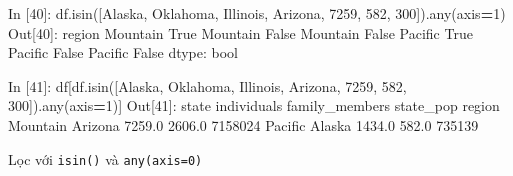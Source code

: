 \documentclass[
]{book}
\newenvironment{Shaded}{\begin{snugshade}}{\end{snugshade}}
\newcommand{\BuiltInTok}[1]{#1}
\newcommand{\DecValTok}[1]{\textcolor[rgb]{0.00,0.00,0.81}{#1}}
\newcommand{\FloatTok}[1]{\textcolor[rgb]{0.00,0.00,0.81}{#1}}
\newcommand{\NormalTok}[1]{#1}
\newcommand{\OperatorTok}[1]{\textcolor[rgb]{0.81,0.36,0.00}{\textbf{#1}}}
\newcommand{\StringTok}[1]{\textcolor[rgb]{0.31,0.60,0.02}{#1}}
\newcommand{\VariableTok}[1]{\textcolor[rgb]{0.00,0.00,0.00}{#1}}
\begin{document}
\begin{Shaded}
\begin{Highlighting}[]
\NormalTok{In [}\DecValTok{40}\NormalTok{]: df.isin([}\StringTok{\textquotesingle{}Alaska\textquotesingle{}}\NormalTok{, }\StringTok{\textquotesingle{}Oklahoma\textquotesingle{}}\NormalTok{, }\StringTok{\textquotesingle{}Illinois\textquotesingle{}}\NormalTok{, }\StringTok{\textquotesingle{}Arizona\textquotesingle{}}\NormalTok{, }\DecValTok{7259}\NormalTok{, }\DecValTok{582}\NormalTok{, }\DecValTok{300}\NormalTok{]).}\BuiltInTok{any}\NormalTok{(axis}\OperatorTok{=}\DecValTok{1}\NormalTok{)}
\NormalTok{Out[}\DecValTok{40}\NormalTok{]:}
\NormalTok{region}
\NormalTok{Mountain     }\VariableTok{True}
\NormalTok{Mountain    }\VariableTok{False}
\NormalTok{Mountain    }\VariableTok{False}
\NormalTok{Pacific      }\VariableTok{True}
\NormalTok{Pacific     }\VariableTok{False}
\NormalTok{Pacific     }\VariableTok{False}
\NormalTok{dtype: }\BuiltInTok{bool}

\NormalTok{In [}\DecValTok{41}\NormalTok{]: df[df.isin([}\StringTok{\textquotesingle{}Alaska\textquotesingle{}}\NormalTok{, }\StringTok{\textquotesingle{}Oklahoma\textquotesingle{}}\NormalTok{, }\StringTok{\textquotesingle{}Illinois\textquotesingle{}}\NormalTok{, }\StringTok{\textquotesingle{}Arizona\textquotesingle{}}\NormalTok{, }\DecValTok{7259}\NormalTok{, }\DecValTok{582}\NormalTok{, }\DecValTok{300}\NormalTok{]).}\BuiltInTok{any}\NormalTok{(axis}\OperatorTok{=}\DecValTok{1}\NormalTok{)]}
\NormalTok{Out[}\DecValTok{41}\NormalTok{]: }
\NormalTok{            state  individuals  family\_members  state\_pop}
\NormalTok{region                                                   }
\NormalTok{Mountain  Arizona       }\FloatTok{7259.0}          \FloatTok{2606.0}    \DecValTok{7158024}
\NormalTok{Pacific    Alaska       }\FloatTok{1434.0}           \FloatTok{582.0}     \DecValTok{735139}
\end{Highlighting}
\end{Shaded}

Lọc với \texttt{isin()} và \texttt{any(axis=0)}
\end{document}
